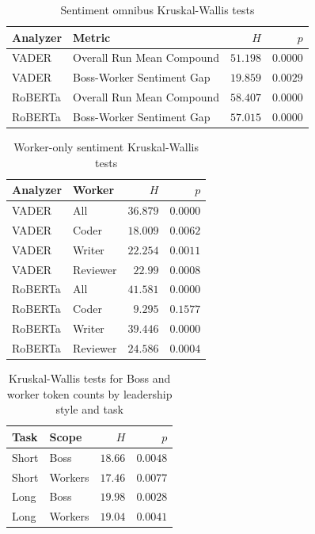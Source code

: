 \begin{table}[htbp]
  \centering
  \small
  \caption{Sentiment omnibus Kruskal-Wallis tests}
  \label{tab:03-sentiment-omnibus}
\begin{tabular}{l>{\raggedright\arraybackslash}p{5.6cm}rr}
    \toprule
    Analyzer & Metric & $H$ & $p$ \\
    \midrule
    VADER & Overall Run Mean Compound & $51.198$ & $0.0000$ \\
    VADER & Boss-Worker Sentiment Gap & $19.859$ & $0.0029$ \\
    RoBERTa & Overall Run Mean Compound & $58.407$ & $0.0000$ \\
    RoBERTa & Boss-Worker Sentiment Gap & $57.015$ & $0.0000$ \\
    \bottomrule
\end{tabular}%
\end{table}

\begin{table}[htbp]
  \centering
  \small
  \caption{Worker-only sentiment Kruskal-Wallis tests}
  \label{tab:03-sentiment-worker}
\begin{tabular}{llrr}
    \toprule
    Analyzer & Worker & $H$ & $p$ \\
    \midrule
    VADER & All & $36.879$ & $0.0000$ \\
    VADER & Coder & $18.009$ & $0.0062$ \\
    VADER & Writer & $22.254$ & $0.0011$ \\
    VADER & Reviewer & $22.99$ & $0.0008$ \\
    RoBERTa & All & $41.581$ & $0.0000$ \\
    RoBERTa & Coder & $9.295$ & $0.1577$ \\
    RoBERTa & Writer & $39.446$ & $0.0000$ \\
    RoBERTa & Reviewer & $24.586$ & $0.0004$ \\
    \bottomrule
\end{tabular}%
\end{table}

\begin{table}[htbp]
  \centering
  \small
  \caption{Kruskal-Wallis tests for Boss and worker token counts by leadership style and task}
  \label{tab:03-boss-worker-tokens-kw}
\begin{tabular}{llrr}
    \toprule
    Task & Scope & $H$ & $p$ \\
    \midrule
    Short & Boss & $18.66$ & $0.0048$ \\
    Short & Workers & $17.46$ & $0.0077$ \\
    Long & Boss & $19.98$ & $0.0028$ \\
    Long & Workers & $19.04$ & $0.0041$ \\
    \bottomrule
\end{tabular}%
\end{table}

